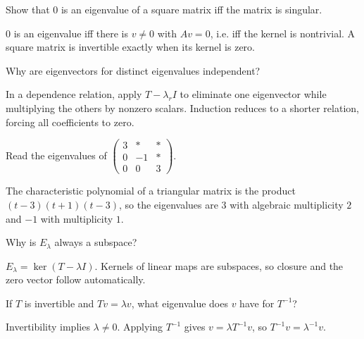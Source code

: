 \begin{problem}\label{prob:i09-problem-05}
Show that $0$ is an eigenvalue of a square matrix iff the matrix is singular.
\end{problem}
\begin{solution}
$0$ is an eigenvalue iff there is $v\ne0$ with $Av=0$, i.e. iff the kernel is nontrivial. A square matrix is invertible exactly when its kernel is zero.
\end{solution}

\begin{problem}\label{prob:i09-problem-06}
Why are eigenvectors for distinct eigenvalues independent?
\end{problem}
\begin{solution}
In a dependence relation, apply $T-\lambda_rI$ to eliminate one eigenvector while multiplying the others by nonzero scalars. Induction reduces to a shorter relation, forcing all coefficients to zero.
\end{solution}

\begin{problem}\label{prob:i09-problem-07}
Read the eigenvalues of $\begin{pmatrix}3&*&*\\0&-1&*\\0&0&3\end{pmatrix}$.
\end{problem}
\begin{solution}
The characteristic polynomial of a triangular matrix is the product $(t-3)(t+1)(t-3)$, so the eigenvalues are $3$ with algebraic multiplicity $2$ and $-1$ with multiplicity $1$.
\end{solution}

\begin{problem}\label{prob:i09-problem-08}
Why is $E_\lambda$ always a subspace?
\end{problem}
\begin{solution}
$E_\lambda=\ker(T-\lambda I)$. Kernels of linear maps are subspaces, so closure and the zero vector follow automatically.
\end{solution}

\begin{problem}\label{prob:i09-problem-09}
If $T$ is invertible and $Tv=\lambda v$, what eigenvalue does $v$ have for $T^{-1}$?
\end{problem}
\begin{solution}
Invertibility implies $\lambda\ne0$. Applying $T^{-1}$ gives $v=\lambda T^{-1}v$, so $T^{-1}v=\lambda^{-1}v$.
\end{solution}

